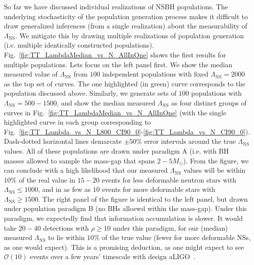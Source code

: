 \documentclass[aps,prd,amsmath,floats,floatfix, twocolumn,
superscriptaddress,nofootinbib,showpacs]{revtex4-1}
\newcommand{\lambdans}{\Lambda_\mathrm{NS}}
\begin{document}
So far we have discussed individual realizations of NSBH populations. The 
underlying stochasticity of the population generation process makes it
difficult to draw generalized inferences (from a single realization) about the
measurability of $\lambdans$. We mitigate this by drawing multiple
realizations of population generation (i.e. multiple identically constructed
populations). Fig.~\ref{fig:TT_LambdaMedian_vs_N_AllInOne} shows the first
results for multiple populations. Lets focus on the left panel first. We
show the median measured value of $\lambdans$ from $100$ independent 
populations with fixed $\lambdans=2000$ as the top set of curves. The one 
highlighted (in green) curve corresponds to the population discussed above.
Similarly, we generate sets of $100$ populations with $\lambdans=500-1500$, and
show the median measured $\lambdans$ as four distinct groups of curves in
Fig.~\ref{fig:TT_LambdaMedian_vs_N_AllInOne} (with the single highlighted
curve in each group corresponding to
Fig.~\ref{fig:TT_Lambda_vs_N_L800_CI90_0}-\ref{fig:TT_Lambda_vs_N_CI90_0}).
Dash-dotted horizontal lines demarcate $\pm50\%$ error intervals around
the true $\lambdans$ values. All of these populations are drawn under
paradigm A (i.e. with BH masses allowed to sample the mass-gap that spans
$2-5M_\odot$).
% 
From the figure, we can conclude with a high likelihood that our measured
$\lambdans$ values will be within $10\%$ of the real value in $15-20$ events
for less deformable neutron stars with $\lambdans\leq 1000$, and in as few as
$10$ events for more deformable stars with $\lambdans\geq 1500$.
% 
The right panel of the figure is identical to the left panel, but drawn under
population paradigm B (no BHs alloewd within the mass-gap). Under this
paradigm, we expectedly find that information accumulation is slower. It would
take $20-40$ detections with $\rho\geq10$ under this paradigm, for our (median)
measured $\lambdans$ to lie within $10\%$ of the true value (fewer for 
more deformable NSs, as one would expect).
% 
This is a promising deduction, as one might expect to see $\mathcal{O}(10)$
events over a few years' timescale with design aLIGO~\cite{Abadie:2010cfa}.
\end{document}
